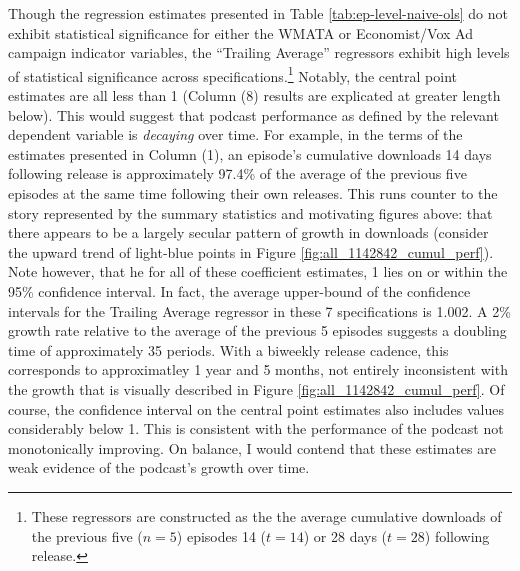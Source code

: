 \documentclass[11pt, letterpaper, twoside]{article}
\begin{document}
Though the regression estimates presented in Table \ref{tab:ep-level-naive-ols} do not exhibit statistical significance for either the WMATA or Economist/Vox Ad campaign indicator variables, the ``Trailing Average'' regressors exhibit high levels of statistical significance across specifications.\footnote{These regressors are constructed as the the average cumulative downloads of the previous five ($n=5$) episodes 14 ($t=14$) or 28 days ($t=28$) following release.} Notably, the central point estimates are all less than 1 (Column (8) results are explicated at greater length below). This would suggest that podcast performance as defined by the relevant dependent variable is \textit{decaying} over time. For example, in the terms of the estimates presented in Column (1), an episode's cumulative downloads 14 days following release is approximately 97.4\% of the average of the previous five episodes at the same time following their own releases. This runs counter to the story represented by the summary statistics and motivating figures above: that there appears to be a largely secular pattern of growth in downloads (consider the upward trend of light-blue points in Figure \ref{fig:all_1142842_cumul_perf}). Note however, that he for all of these coefficient estimates, 1 lies on or within the 95\% confidence interval. In fact, the average upper-bound of the confidence intervals for the Trailing Average regressor in these 7 specifications is 1.002. A 2\% growth rate relative to the average of the previous 5 episodes suggests a doubling time of approximately 35 periods. With a biweekly release cadence, this corresponds to approximatley 1 year and 5 months, not entirely inconsistent with the growth that is visually described in Figure \ref{fig:all_1142842_cumul_perf}. Of course, the confidence interval on the central point estimates also includes values considerably below 1. This is consistent with the performance of the podcast not monotonically improving. On balance, I would contend that these estimates are weak evidence of the podcast's growth over time.\\

\begin{landscape}
  
\end{landscape}
\end{document}
